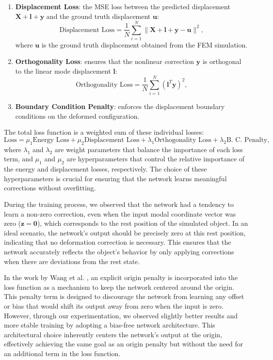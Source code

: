 \begin{enumerate}
    \item \textbf{Displacement Loss}: the MSE loss between the predicted displacement \( \bm{X} + \bm{l} + \bm{y} \) and the ground truth displacement \( \bm{u} \):
    \begin{equation}
        \text{Displacement Loss} = \frac{1}{N} \sum_{i=1}^N \|\bm{X} + \bm{l} + \bm{y} - \bm{u}\|^2,
    \end{equation}
    where \( \bm{u} \) is the ground truth displacement obtained from the FEM simulation.
    \item \textbf{Orthogonality Loss}: ensures that the nonlinear correction \( \bm{y} \) is orthogonal to the linear mode displacement \( \bm{l} \):
    \begin{equation}
        \text{Orthogonality Loss} = \frac{1}{N} \sum_{i=1}^N (\bm{l}^T \bm{y})^2,
    \end{equation}

    \item \textbf{Boundary Condition Penalty}: enforces the displacement boundary conditions on the deformed configuration.
    
\end{enumerate}

The total loss function is a weighted sum of these individual losses:
\begin{equation}
    \text{Loss} = \mu_1 \text{Energy Loss} + \mu_2 \text{Displacement Loss}+ \lambda_1 \text{Orthogonality Loss} + \lambda_2 \text{B. C. Penalty},
\end{equation}
where $\lambda_1$ and $\lambda_2$ are weight parameters that balance the importance of each loss term, and $\mu_1$ and $\mu_2$ are hyperparameters that control the relative importance of the energy and displacement losses, respectively. The choice of these hyperparameters is crucial for ensuring that the network learns meaningful corrections without overfitting.

During the training process, we observed that the network had a tendency to learn a non-zero correction, even when the input modal coordinate vector was zero (\(\bm{z} = \bm{0}\)), which corresponds to the rest position of the simulated object. In an ideal scenario, the network's output should be precisely zero at this rest position, indicating that no deformation correction is necessary. This ensures that the network accurately reflects the object's behavior by only applying corrections when there are deviations from the rest state.

In the work by Wang et al. \cite{Wang_Du_Coros_Thomaszewski_2024}, an explicit origin penalty is incorporated into the loss function as a mechanism to keep the network centered around the origin. This penalty term is designed to discourage the network from learning any offset or bias that would shift its output away from zero when the input is zero. However, through our experimentation, we observed slightly better results and more stable training by adopting a bias-free network architecture. This architectural choice inherently centers the network's output at the origin, effectively achieving the same goal as an origin penalty but without the need for an additional term in the loss function.

